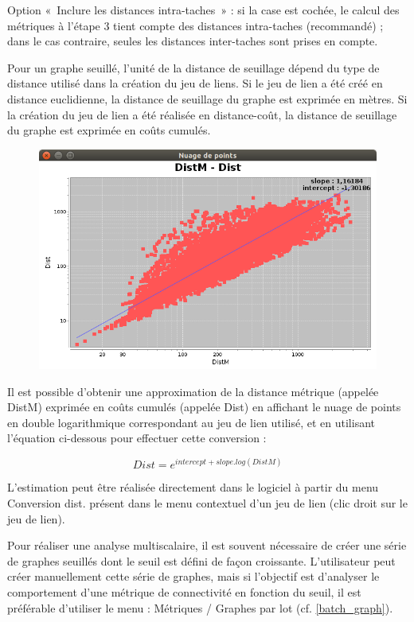 \documentclass{article}
\begin{document}
Option «~Inclure les distances intra-taches~» : si la case est cochée, le calcul des métriques à l’étape 3 tient compte des distances intra-taches (recommandé) ; dans le cas contraire, seules les distances inter-taches sont prises en compte.

Pour un graphe seuillé, l’unité de la distance de seuillage dépend du type de distance utilisé dans la création du jeu de liens. Si le jeu de lien a été créé en distance euclidienne, la distance de seuillage du graphe est exprimée en mètres. Si la création du jeu de lien a été réalisée en distance-coût, la distance de seuillage du graphe est exprimée en coûts cumulés. 

\begin{figure}[H]
	\includegraphics[scale=0.5]{img/manual-fr_img7.png} 
\end{figure}

Il est possible d’obtenir une approximation de la distance métrique (appelée DistM) exprimée en coûts cumulés (appelée Dist) en affichant le nuage de points en double logarithmique correspondant au jeu de lien utilisé, et en utilisant l'équation ci-dessous pour effectuer cette conversion :

$$Dist = e^{intercept + slope . log(DistM)}$$

L'estimation peut être réalisée directement dans le logiciel à partir du menu Conversion dist. présent dans le menu contextuel d'un jeu de lien (clic droit sur le jeu de lien).

Pour réaliser une analyse multiscalaire, il est souvent nécessaire de créer une série de graphes seuillés dont le seuil est défini de façon croissante. L’utilisateur peut créer manuellement cette série de graphes, mais si l’objectif est d’analyser le comportement d’une métrique de connectivité en fonction du seuil, il est préférable d’utiliser le menu : Métriques / Graphes par lot (cf. \ref{batch_graph}).
\end{document}
